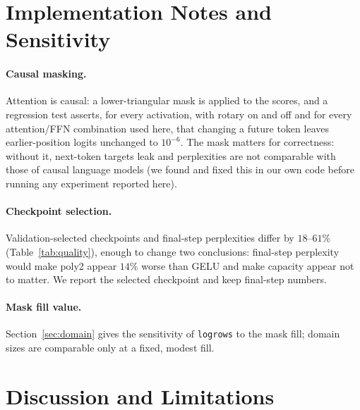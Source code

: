 \documentclass[10pt]{article}
\begin{document}
\section{Implementation Notes and Sensitivity}
\label{sec:causal}

\paragraph{Causal masking.}
Attention is causal: a lower-triangular mask is applied to the scores, and a
regression test asserts, for every activation, with rotary on and off and for
every attention/FFN combination used here, that changing a future token leaves
earlier-position logits unchanged to $10^{-6}$. The mask matters for correctness:
without it, next-token targets leak and perplexities are not comparable with those
of causal language models (we found and fixed this in our own code before running
any experiment reported here).

\paragraph{Checkpoint selection.}
Validation-selected checkpoints and final-step perplexities differ by $18$--$61\%$
(Table~\ref{tab:quality}), enough to change two conclusions: final-step
perplexity would make poly2 appear $14\%$ worse than GELU and make capacity appear
not to matter. We report the selected checkpoint and keep final-step numbers.

\paragraph{Mask fill value.}
Section~\ref{sec:domain} gives the sensitivity of \texttt{logrows} to the mask
fill; domain sizes are comparable only at a fixed, modest fill.

\section{Discussion and Limitations}
\label{sec:limits}
\end{document}
